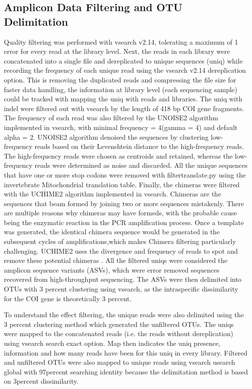 \documentclass[11pt, a4paper]{article}
\begin{document}
\subsection{Amplicon Data Filtering and OTU Delimitation}
Quality filtering was performed with vsearch v2.14\cite{vsearch}, tolerating a maximum of 1 error for every read at the library level.  Next, the reads  in each library were  concatenated  into a single file and dereplicated to unique sequences (uniq) while recording the frequency of each unique read using the vsearch v2.14 dereplication option. This is removing the duplicated reads and compressing the file size for faster data handling, the information at library level (each sequencing sample) could be tracked with mapping the uniq with reads and libraries.
The uniq with indel were filtered out with vsearch by the length of 418 bp COI gene fragments. The frequency of each read was also filtered by the UNOISE2 \cite{Edgar2016} algorithm implemented in vsearch, with minimal frequency = 4(gamma = 4) and default alpha = 2. UNOISE2 algorithm denoised the sequences by clustering low-frequency reads  based on their Levenshtein distance to the high-frequency reads\cite{Edgar2016}. The high-frequency reads were chosen as centroids and retained, whereas the low-frequency reads were determined as noise and discarded. All the  unique sequences that have one or more stop codons were removed with filtertranslate.py \cite{Andujar2020}using the invertebrate Mitochondrial translation table. Finally, the chimeras were filtered with the UCHIME2\cite{Edgar2016b} algorithm implemented in vsearch.  Chimeras are the sequences that beam formed by joining two or more sequences mistakenly.  There are multiple reasons why chimeras may have formeds, with the probable cause being the  enzymatic reaction in the PCR amplification process. Once a template was generated, the identical  chimera sequence would be generated in the subsequent cycles of amplifications,which makes Chimera filtering particularly challenging.  UCHIME2 uses  the divergence and frequency of reads to spot and remove these potential  chimeras\cite{Edgar2016a} . 
All the filtered uniqs were considered the amplicon sequence variants (ASVs), which were error removed sequences recovered from high-throughput sequencing. The ASVs were then delimited into OTUs with 3 percent clustering using vsearch, as the intraspecific dissimilarity  for the COI gene is  theoretically 3 percent. 

To understand the effect filtering, the unique reads were also delimited using the 3 percent clustering method which generated the unfiltered OTUs. 
The uniqs were mapped to the concatenated reads (i.e. the reads without dereplication) using vsearch search exact option. Map then indicates the uniq presence, information and how many reads have been for this uniq in every library. Filtered and unfiltered OTUs were also mapped to unique reads using vsearch usearch global with 97percent searching identity because the delimitation method is based on 3percent dissimilarity.
\end{document}
